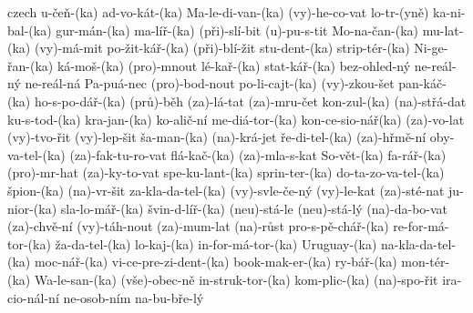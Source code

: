 \begin{hyphenrules}{czech}
{ u-čeň-(ka)
 ad-vo-kát-(ka)
 Ma-le-di-van-(ka)
 (vy)-he-co-vat
 lo-tr-(yně)
 ka-ni-bal-(ka)
 gur-mán-(ka)
 ma-líř-(ka)
 (při)-slí-bit
 (u)-pu-s-tit
 Mo-na-čan-(ka)
 mu-lat-(ka)
 (vy)-má-mit
 po-žit-kář-(ka)
(při)-blí-žit
stu-dent-(ka)
strip-tér-(ka)
Ni-ge-řan-(ka)
ká-moš-(ka)
(pro)-mnout
lé-kař-(ka)
stat-kář-(ka)
bez-ohled-ný
ne-reál-ný
ne-reál-ná
Pa-puá-nec
(pro)-bod-nout
po-li-cajt-(ka)
(vy)-zkou-šet
pan-káč-(ka)
ho-s-po-dář-(ka)
(prů)-běh
(za)-lá-tat
(za)-mru-čet
kon-zul-(ka)
(na)-střá-dat
ku-s-tod-(ka)
kra-jan-(ka)
ko-alič-ní
me-diá-tor-(ka)
kon-ce-sio-nář(ka)
(za)-vo-lat
(vy)-tvo-řit
(vy)-lep-šit
ša-man-(ka)
(na)-krá-jet
ře-di-tel-(ka)
(za)-hřmě-ní
oby-va-tel-(ka)
(za)-fak-tu-ro-vat
flá-kač-(ka)
(za)-mla-s-kat
So-vět-(ka)
fa-rář-(ka)
(pro)-mr-hat
(za)-ky-to-vat
spe-ku-lant-(ka)
sprin-ter-(ka)
do-ta-zo-va-tel-(ka)
špion-(ka)
(na)-vr-šit
za-kla-da-tel-(ka)
(vy)-svle-če-ný
(vy)-le-kat
(za)-sté-nat
ju-nior-(ka)
sla-lo-mář-(ka)
švin-d-líř-(ka)
(neu)-stá-le
(neu)-stá-lý
(na)-da-bo-vat
(za)-chvě-ní
(vy)-táh-nout
(za)-mum-lat
(na)-růst
pro-s-pě-chář-(ka)
re-for-má-tor-(ka)
ža-da-tel-(ka)
lo-kaj-(ka)
in-for-má-tor-(ka)
Uruguay-(ka)
na-kla-da-tel-(ka)
moc-nář-(ka)
vi-ce-pre-zi-dent-(ka)
book-mak-er-(ka)
ry-bář-(ka)
mon-tér-(ka)
Wa-le-san-(ka)
(vše)-obec-ně
in-struk-tor-(ka)
kom-plic-(ka)
(na)-spo-řit
ira-cio-nál-ní
ne-osob-ním
na-bu-bře-lý
}
\end{hyphenrules}
